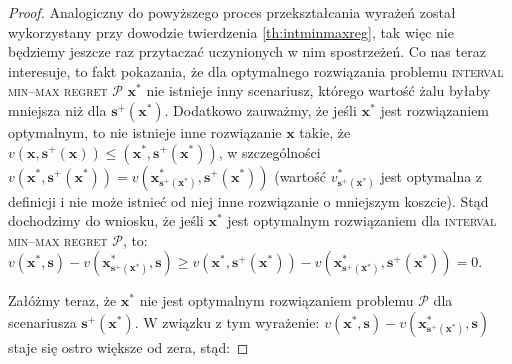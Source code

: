 \begin{proof}
	Analogiczny do powyższego proces przekształcania wyrażeń został wykorzystany przy dowodzie twierdzenia \ref{th:intminmaxreg}, tak więc nie będziemy jeszcze raz przytaczać uczynionych w nim spostrzeżeń. Co nas teraz interesuje, to fakt pokazania, że dla optymalnego rozwiązania problemu \textsc{interval min--max regret $\mathcal{P}$} $\textbf{x}^{\ast}$ nie istnieje inny scenariusz, którego wartość żalu byłaby mniejsza niż dla $\textbf{s}^{+} \left( \textbf{x}^{\ast} \right)$. Dodatkowo zauważmy, że jeśli $\textbf{x}^{\ast}$ jest rozwiązaniem optymalnym, to nie istnieje inne rozwiązanie $\textbf{x}$ takie, że $v \left( \textbf{x}, \textbf{s}^{+} \left( \textbf{x} \right) \right) \leqslant \left( \textbf{x}^{\ast}, \textbf{s}^{+} \left( \textbf{x}^{\ast} \right) \right)$, w szczególności $v \left( \textbf{x}^{\ast}, \textbf{s}^{+} \left( \textbf{x}^{\ast} \right) \right) = v \left( \textbf{x}^{\ast}_{\textbf{s}^{+} \left( \textbf{x}^{\ast} \right)}, \textbf{s}^{+} \left( \textbf{x}^{\ast} \right) \right)$ (wartość $v^{\ast}_{\textbf{s}^{+} \left( \textbf{x}^{\ast} \right)}$ jest optymalna z definicji i nie może istnieć od niej inne rozwiązanie o mniejszym koszcie). Stąd dochodzimy do wniosku, że jeśli $\textbf{x}^{\ast}$ jest optymalnym rozwiązaniem dla \textsc{interval min--max regret $\mathcal{P}$}, to: $v \left( \textbf{x}^{\ast}, \textbf{s} \right) - v \left( \textbf{x}^{\ast}_{\textbf{s}^{+} \left( \textbf{x}^{\ast} \right)}, \textbf{s} \right) \geqslant v \left( \textbf{x}^{\ast}, \textbf{s}^{+} \left( \textbf{x}^{\ast} \right) \right) - v \left( \textbf{x}^{\ast}_{\textbf{s}^{+} \left( \textbf{x}^{\ast} \right)}, \textbf{s}^{+} \left( \textbf{x}^{\ast} \right) \right) = 0$.
	
	Załóżmy teraz, że $\textbf{x}^{\ast}$ nie jest optymalnym rozwiązaniem problemu $\mathcal{P}$ dla scenariusza $\textbf{s}^{+} \left( \textbf{x}^{\ast} \right)$. W związku z tym wyrażenie: $v \left( \textbf{x}^{\ast}, \textbf{s} \right) - v \left( \textbf{x}^{\ast}_{\textbf{s}^{+} \left( \textbf{x}^{\ast} \right)}, \textbf{s} \right)$ staje się ostro większe od zera, stąd:
	

\end{proof}
